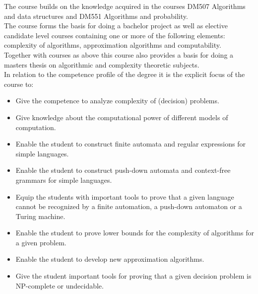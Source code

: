 \documentclass[a4paper,10pt,titlepage]{report}
\begin{document}
The course builds on the knowledge 
acquired in the courses DM507 Algorithms and data structures and DM551 
Algorithms and probability.\\
\vspace{5mm}
The course forms the basis for doing a
bachelor project as well as elective candidate level courses containing
one or more of the following elements: complexity of algorithms, 
approximation algorithms and computability.\\
\vspace{5mm}
Together with courses as above this course also provides a basis for doing a masters thesis on algorithmic  and complexity theoretic subjects.\\
\vspace{5mm}
In relation to the competence profile of the degree it is the explicit focus of the course to:
\begin{itemize}
\item Give the competence to analyze complexity of (decision) problems.
\item Give knowledge about the computational power of different models of computation.
\item Enable the student to construct finite automata and regular expressions for simple languages.
\item Enable the student to construct push-down automata and context-free grammars for simple languages.
\item Equip the students with important tools to prove that a given language cannot
be recognized by a finite automation, a push-down automaton or a Turing
machine.
\item Enable the student to prove lower bounds for the complexity of algorithms for a given problem.
\item Enable the student to develop new approximation algorithms.
\item Give the student important tools for proving that a given decision problem is NP-complete or undecidable.
\end{itemize}
\end{document}
